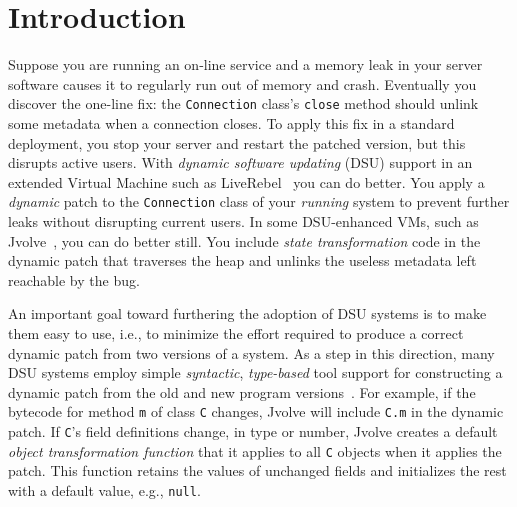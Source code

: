 \documentclass[natbib,10pt]{sigplanconf}
\newcommand{\code}[1]{\lstinline|#1|\xspace}
\begin{document}
\section{Introduction}

Suppose you are running an on-line service and a memory leak in your
server software causes it to regularly run out of memory and
crash.  Eventually you discover the one-line fix: the
\code{Connection} class's \code{close} method should
unlink some metadata when a connection closes.  To apply this
fix in a standard deployment, you stop your server and restart
the patched version, but this disrupts active users.  With 
\emph{dynamic software updating} (DSU) support in an extended Virtual Machine
such as LiveRebel~\cite{javarebel} you
can do better. You apply a \emph{dynamic} patch 
to the \code{Connection} class of your \emph{running}
system to prevent further leaks without disrupting current users.
In some DSU-enhanced VMs, such as Jvolve~\cite{jvolve}, you can do better
still. You include \emph{state 
  transformation} code in the dynamic patch that traverses the
heap and unlinks the useless metadata left reachable by the bug.


An important goal toward furthering the adoption of DSU systems is to
make them easy to use, i.e., to minimize the effort required to
produce a correct dynamic patch from two versions of a system.  As a
step in this direction, many DSU systems employ simple
\emph{syntactic}, \emph{type-based} tool support for constructing a
dynamic patch from the old and new program
versions~\cite{jvolve,ksplice,neamtiu06dsu, HicksNettles03}.  For
example, if the bytecode for method \code{m} of class \code{C} changes, Jvolve
will include \code{C.m} in the dynamic patch.  If \code{C}'s field
definitions change, in type or number, Jvolve creates a default
\emph{object transformation function} that it  applies to all
\code{C} objects when it applies the patch. This function retains
the values of unchanged fields and initializes the rest with a default
value, e.g., \code{null}.
\end{document}
